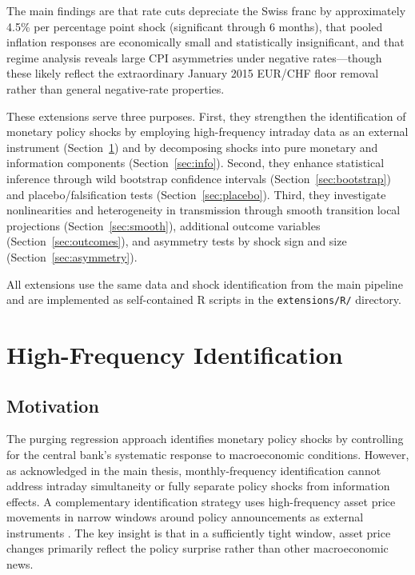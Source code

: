 \documentclass[12pt,a4paper]{article}
\begin{document}
The main findings are that rate cuts depreciate the Swiss franc by approximately 4.5\% per percentage point shock (significant through 6 months), that pooled inflation responses are economically small and statistically insignificant, and that regime analysis reveals large CPI asymmetries under negative rates---though these likely reflect the extraordinary January 2015 EUR/CHF floor removal rather than general negative-rate properties.

These extensions serve three purposes. First, they strengthen the identification of monetary policy shocks by employing high-frequency intraday data as an external instrument (Section~\ref{sec:hf}) and by decomposing shocks into pure monetary and information components (Section~\ref{sec:info}). Second, they enhance statistical inference through wild bootstrap confidence intervals (Section~\ref{sec:bootstrap}) and placebo/falsification tests (Section~\ref{sec:placebo}). Third, they investigate nonlinearities and heterogeneity in transmission through smooth transition local projections (Section~\ref{sec:smooth}), additional outcome variables (Section~\ref{sec:outcomes}), and asymmetry tests by shock sign and size (Section~\ref{sec:asymmetry}).

All extensions use the same data and shock identification from the main pipeline and are implemented as self-contained R scripts in the \texttt{extensions/R/} directory.


\section{High-Frequency Identification}\label{sec:hf}

\subsection{Motivation}

The purging regression approach identifies monetary policy shocks by controlling for the central bank's systematic response to macroeconomic conditions. However, as acknowledged in the main thesis, monthly-frequency identification cannot address intraday simultaneity or fully separate policy shocks from information effects. A complementary identification strategy uses high-frequency asset price movements in narrow windows around policy announcements as external instruments \citep{gertler2015, stock2018}. The key insight is that in a sufficiently tight window, asset price changes primarily reflect the policy surprise rather than other macroeconomic news.
\end{document}
